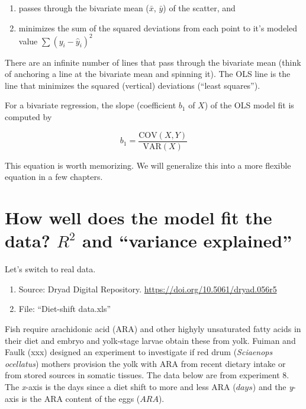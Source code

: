 \documentclass[]{book}
\providecommand{\tightlist}{%
  \setlength{\itemsep}{0pt}\setlength{\parskip}{0pt}}
\begin{document}
\begin{enumerate}
\def\labelenumi{\arabic{enumi}.}
\tightlist
\item
  passes through the bivariate mean (\(\bar{x}\), \(\bar{y}\)) of the scatter, and
\item
  minimizes the sum of the squared deviations from each point to it's modeled value \(\sum{(y_i - \hat{y}_i)^2}\)
\end{enumerate}

There are an infinite number of lines that pass through the bivariate mean (think of anchoring a line at the bivariate mean and spinning it). The OLS line is the line that minimizes the squared (vertical) deviations (``least squares'').

For a bivariate regression, the slope (coefficient \(b_1\) of \(X\)) of the OLS model fit is computed by

\begin{equation}
b_1 = \frac{\mathrm{COV}(X, Y)}{\mathrm{VAR}(X)}
\end{equation}

This equation is worth memorizing. We will generalize this into a more flexible equation in a few chapters.

\hypertarget{how-well-does-the-model-fit-the-data-r2-and-variance-explained}{%
\section{\texorpdfstring{How well does the model fit the data? \(R^2\) and ``variance explained''}{How well does the model fit the data? R\^{}2 and ``variance explained''}}\label{how-well-does-the-model-fit-the-data-r2-and-variance-explained}}

Let's switch to real data.

\begin{enumerate}
\def\labelenumi{\arabic{enumi}.}
\tightlist
\item
  Source: Dryad Digital Repository. \url{https://doi.org/10.5061/dryad.056r5}
\item
  File: ``Diet-shift data.xls''
\end{enumerate}

Fish require arachidonic acid (ARA) and other highyly unsaturated fatty acids in their diet and embryo and yolk-stage larvae obtain these from yolk. Fuiman and Faulk (xxx) designed an experiment to investigate if red drum (\emph{Sciaenops ocellatus}) mothers provision the yolk with ARA from recent dietary intake or from stored sources in somatic tissues. The data below are from experiment 8. The \emph{x}-axis is the days since a diet shift to more and less ARA (\(days\)) and the \emph{y}-axis is the ARA content of the eggs (\(ARA\)).
\end{document}
